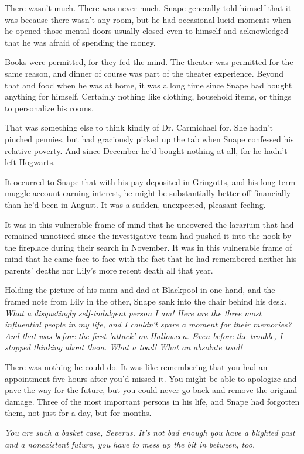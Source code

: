 \documentclass[a4paper,11pt]{article}
\begin{document}
There wasn't much. There was never much. Snape generally told himself that it was because there wasn't any room, but he had occasional lucid moments when he opened those mental doors usually closed even to himself and acknowledged that he was afraid of spending the money.

Books were permitted, for they fed the mind. The theater was permitted for the same reason, and dinner of course was part of the theater experience. Beyond that and food when he was at home, it was a long time since Snape had bought anything for himself. Certainly nothing like clothing, household items, or things to personalize his rooms.

That was something else to think kindly of Dr. Carmichael for. She hadn't pinched pennies, but had graciously picked up the tab when Snape confessed his relative poverty. And since December he'd bought nothing at all, for he hadn't left Hogwarts.

It occurred to Snape that with his pay deposited in Gringotts, and his long term muggle account earning interest, he might be substantially better off financially than he'd been in August. It was a sudden, unexpected, pleasant feeling.

It was in this vulnerable frame of mind that he uncovered the lararium that had remained unnoticed since the investigative team had pushed it into the nook by the fireplace during their search in November. It was in this vulnerable frame of mind that he came face to face with the fact that he had remembered neither his parents' deaths nor Lily's more recent death all that year.

Holding the picture of his mum and dad at Blackpool in one hand, and the framed note from Lily in the other, Snape sank into the chair behind his desk. \emph{What a disgustingly self-indulgent person I am! Here are the three most influential people in my life, and I couldn't spare a moment for their memories? And that was before the first 'attack' on Halloween. Even before the trouble, I stopped thinking about them. What a toad! What an absolute toad!}

There was nothing he could do. It was like remembering that you had an appointment five hours after you'd missed it. You might be able to apologize and pave the way for the future, but you could never go back and remove the original damage. Three of the most important persons in his life, and Snape had forgotten them, not just for a day, but for months.

\emph{You are such a basket case, Severus. It's not bad enough you have a blighted past and a nonexistent future, you have to mess up the bit in between, too.}
\end{document}
